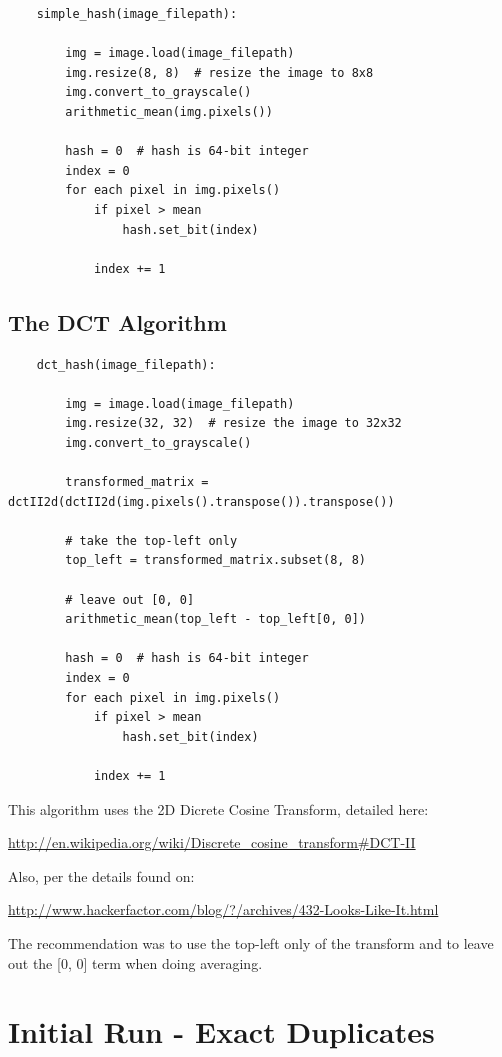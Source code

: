 \documentclass[11pt,a4paper,titlepage]{article}
\begin{document}
\begin{lstlisting}
    simple_hash(image_filepath):

        img = image.load(image_filepath)
        img.resize(8, 8)  # resize the image to 8x8
        img.convert_to_grayscale()
        arithmetic_mean(img.pixels())

        hash = 0  # hash is 64-bit integer
        index = 0
        for each pixel in img.pixels()
            if pixel > mean
                hash.set_bit(index)

            index += 1

\end{lstlisting}

\subsection{The DCT Algorithm}

\begin{lstlisting}
    dct_hash(image_filepath):

        img = image.load(image_filepath)
        img.resize(32, 32)  # resize the image to 32x32
        img.convert_to_grayscale()

        transformed_matrix = dctII2d(dctII2d(img.pixels().transpose()).transpose())
        
        # take the top-left only
        top_left = transformed_matrix.subset(8, 8)

        # leave out [0, 0]
        arithmetic_mean(top_left - top_left[0, 0])

        hash = 0  # hash is 64-bit integer
        index = 0
        for each pixel in img.pixels()
            if pixel > mean
                hash.set_bit(index)

            index += 1

\end{lstlisting}

This algorithm uses the 2D Dicrete Cosine Transform, detailed here:

\url{http://en.wikipedia.org/wiki/Discrete_cosine_transform#DCT-II}

Also, per the details found on:

\url{http://www.hackerfactor.com/blog/?/archives/432-Looks-Like-It.html}

The recommendation was to use the top-left only of the transform and to leave
out the [0, 0] term when doing averaging.

\section{Initial Run - Exact Duplicates}
\end{document}
